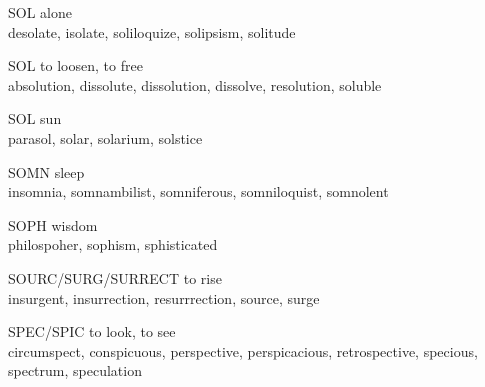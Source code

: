 \begin{flashcard}[Roots]{SOL}
alone\\
\vspace{0.2in}
desolate, isolate, soliloquize, solipsism, solitude\\
\end{flashcard}

\begin{flashcard}[Roots]{SOL}
to loosen, to free\\
\vspace{0.2in}
absolution, dissolute, dissolution, dissolve, resolution, soluble\\
\end{flashcard}

\begin{flashcard}[Roots]{SOL}
sun\\
\vspace{0.2in}
parasol, solar, solarium, solstice\\
\end{flashcard}

\begin{flashcard}[Roots]{SOMN}
sleep\\
\vspace{0.2in}
insomnia, somnambilist, somniferous, somniloquist, somnolent\\
\end{flashcard}

\begin{flashcard}[Roots]{SOPH}
wisdom\\
\vspace{0.2in}
philospoher, sophism, sphisticated\\
\end{flashcard}

\begin{flashcard}[Roots]{SOURC/SURG/SURRECT}
to rise\\
\vspace{0.2in}
insurgent, insurrection, resurrrection, source, surge\\
\end{flashcard}

\begin{flashcard}[Roots]{SPEC/SPIC}
to look, to see\\
\vspace{0.2in}
circumspect, conspicuous, perspective, perspicacious, retrospective, specious, spectrum, speculation\\
\end{flashcard}

